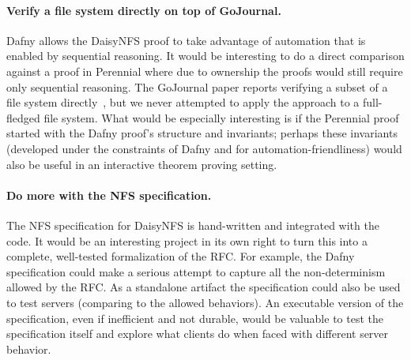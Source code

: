 \paragraph{Verify a file system directly on top of GoJournal.} Dafny allows
the DaisyNFS proof to take advantage of automation that is enabled by sequential
reasoning. It would be interesting to do a direct comparison against a proof in
Perennial where due to ownership the proofs would still require only sequential
reasoning. The GoJournal paper reports verifying a subset of a file system
directly~\cite{chajed:gojournal}, but we never attempted to apply the approach
to a full-fledged file system. What would be especially interesting is if the
Perennial proof started with the Dafny proof's structure and invariants; perhaps
these invariants (developed under the constraints of Dafny and for
automation-friendliness) would also be useful in an interactive theorem proving
setting.

\paragraph{Do more with the NFS specification.} The NFS specification for
DaisyNFS is hand-written and integrated with the code. It would be an
interesting project in its own right to turn this into a complete, well-tested
formalization of the RFC. For example, the Dafny specification could make a serious
attempt to capture all the non-determinism allowed by the RFC. As a standalone
artifact the specification could also be used to test servers (comparing to the
allowed behaviors). An executable version of the specification, even if
inefficient and not durable, would be valuable to test the specification itself
and explore what clients do when faced with different server behavior.
